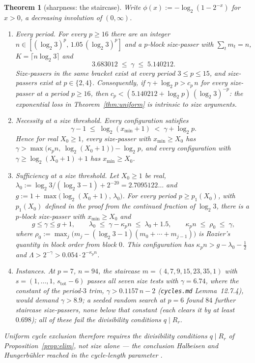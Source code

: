 \documentclass[11pt]{article}
\newtheorem{theorem}{Theorem}[section]
\theoremstyle{remark}
\newcommand{\LL}{\log_2 3}
\newcommand{\kp}{\kappa_p}
\newcommand{\stot}{s_{\mathrm{tot}}}
\begin{document}
\begin{theorem}[sharpness: the staircase]\label{thm:staircase}
Write $\phi(x) := -\log_2(1 - 2^{-x})$ for $x > 0$, a decreasing involution of $(0,\infty)$.
\begin{enumerate}
\item[(i)] \emph{Every period.} For every $p \ge 16$ there are an integer $n \in [(\LL)^p,\, 1.05\,(\LL)^p]$ and a $p$-block size-passer with $\sum_t m_t = n$, $K = \lceil n\LL\rceil$ and
\[ 3.683012 \;\le\; \gamma \;\le\; 5.140212 . \]
Size-passers in the same bracket exist at every period $3 \le p \le 15$, and size-passers exist at $p \in \{2,4\}$. Consequently, if $\gamma + \log_2 p > c_p\, n$ for every size-passer at a period $p \ge 16$, then $c_p < (5.140212 + \log_2 p)\,(\LL)^{-p}$: the exponential loss in Theorem~\ref{thm:uniform} is intrinsic to size arguments.
\item[(ii)] \emph{Necessity at a size threshold.} Every configuration satisfies
\[ \gamma - 1 \;\le\; \log_2(x_{\min} + 1) \;<\; \gamma + \log_2 p . \]
Hence for real $X_0 \ge 1$, every size-passer with $x_{\min} \ge X_0$ has $\gamma > \max\bigl(\kp n,\ \log_2(X_0+1)\bigr) - \log_2 p$, and every configuration with $\gamma \ge \log_2(X_0 + 1) + 1$ has $x_{\min} \ge X_0$.
\item[(iii)] \emph{Sufficiency at a size threshold.} Let $X_0 \ge 1$ be real, $\lambda_0 := \LL/(\LL-1) + 2^{-20} = 2.7095122\ldots$ and $g := 1 + \max\bigl(\log_2(X_0+1),\, \lambda_0\bigr)$. For every period $p \ge p_1(X_0)$, with $p_1(X_0)$ defined in the proof from the continued fraction of $\LL$, there is a $p$-block size-passer with $x_{\min} \ge X_0$ and
\[ g \le \gamma \le g + 1, \qquad \lambda_0 \;\le\; \gamma - \kp n \;\le\; \lambda_0 + 1.5, \qquad \kp n \;\le\; \rho_0 \;\le\; \gamma , \]
where $\rho_0 := \max_j\bigl(m_j - (\LL-1)(m_0 + \cdots + m_{j-1})\bigr)$ is Rozier's quantity in block order from block $0$. This configuration has $\kp n > g - \lambda_0 - \tfrac12$ and $\Lambda > 2^{-\gamma} > 0.054\cdot 2^{-\kp n}$.
\item[(iv)] \emph{Instances.} At $p=7$, $n=94$, the staircase $m = (4,7,9,15,23,35,1)$ with $s = (1,\dots,1,\,\stot-6)$ passes all seven size tests with $\gamma = 6.74$, where the constant of the period-$3$ trim, $\gamma > 0.1157\,n - 2$ (\texttt{cycles.md} Lemma~12.7.4), would demand $\gamma > 8.9$; a seeded random search at $p=6$ found $84$ further staircase size-passers, none below that constant (each clears it by at least $0.698$); all of these fail the divisibility conditions $q \mid R_r$.
\end{enumerate}
Uniform cycle exclusion therefore requires the divisibility conditions $q \mid R_r$ of Proposition~\ref{prop:elim}, not size alone --- the conclusion Halbeisen and Hungerb\"uhler reached in the cycle-length parameter \cite[p.~238]{hh}.
\end{theorem}
\end{document}
